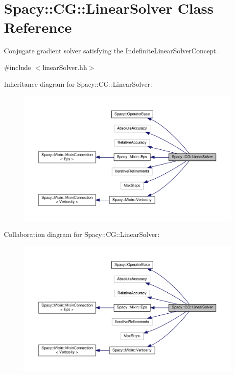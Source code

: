 \hypertarget{classSpacy_1_1CG_1_1LinearSolver}{\section{Spacy\-:\-:C\-G\-:\-:Linear\-Solver Class Reference}
\label{classSpacy_1_1CG_1_1LinearSolver}
}


Conjugate gradient solver satisfying the Indefinite\-Linear\-Solver\-Concept.  




{\ttfamily \#include $<$linear\-Solver.\-hh$>$}



Inheritance diagram for Spacy\-:\-:C\-G\-:\-:Linear\-Solver\-:
\nopagebreak
\begin{figure}[H]
\begin{center}
\leavevmode
\includegraphics[width=350pt]{classSpacy_1_1CG_1_1LinearSolver__inherit__graph}
\end{center}
\end{figure}


Collaboration diagram for Spacy\-:\-:C\-G\-:\-:Linear\-Solver\-:
\nopagebreak
\begin{figure}[H]
\begin{center}
\leavevmode
\includegraphics[width=350pt]{classSpacy_1_1CG_1_1LinearSolver__coll__graph}
\end{center}
\end{figure}
